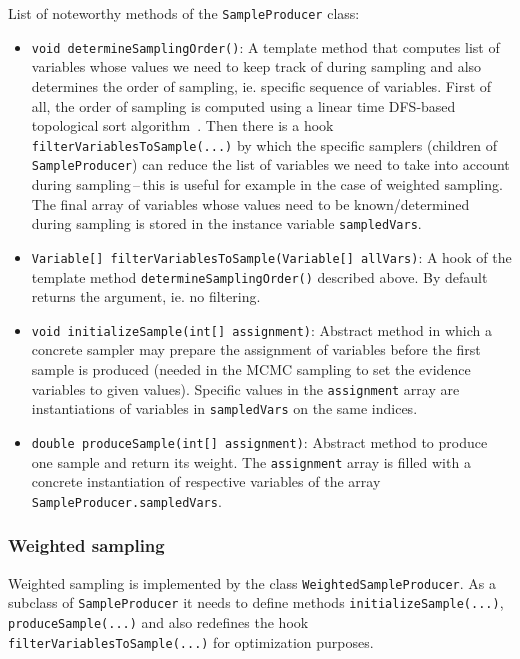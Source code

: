 \documentclass[english,cover]{fitthesis} %
\newcommand{\srccode}[1]{{\tt #1}}         %
\begin{document}
List of noteworthy methods of the \srccode{SampleProducer} class:
\begin{itemize}
	\item \srccode{void determineSamplingOrder()}: A template method that computes list of variables whose values we need to keep track of during sampling and also determines the order of sampling, ie. specific sequence of variables. First of all, the order of sampling is computed using a linear time DFS-based topological sort algorithm~\cite{cormen_introduction_to_algorithms}. Then there is a hook \srccode{filterVariablesToSample(...)} by which the specific samplers (children of \srccode{SampleProducer}) can reduce the list of variables we need to take into account during sampling\,--\,this is useful for example in the case of weighted sampling. The final array of variables whose values need to be known/determined during sampling is stored in the instance variable \srccode{sampledVars}.
	\item \srccode{Variable[] filterVariablesToSample(Variable[] allVars)}: A hook of the template method \srccode{determineSamplingOrder()} described above. By default returns the argument, ie. no filtering.
	\item \srccode{void initializeSample(int[] assignment)}: Abstract method in which a concrete sampler may prepare the assignment of variables before the first sample is produced (needed in the MCMC sampling to set the evidence variables to given values). Specific values in the \srccode{assignment} array are instantiations of variables in \srccode{sampledVars} on the same indices.
	\item \srccode{double produceSample(int[] assignment)}: Abstract method to produce one sample and return its weight. The \srccode{assignment} array is filled with a concrete instantiation of respective variables of the array \srccode{SampleProducer.sampledVars}.
\end{itemize}


\subsubsection{Weighted sampling}
Weighted sampling is implemented by the class \srccode{WeightedSampleProducer}. As a subclass of \srccode{SampleProducer} it needs to define methods \srccode{initializeSample(...)}, \srccode{produceSample(...)} and also redefines the hook \srccode{filterVariablesToSample(...)} for optimization purposes.
\end{document}
